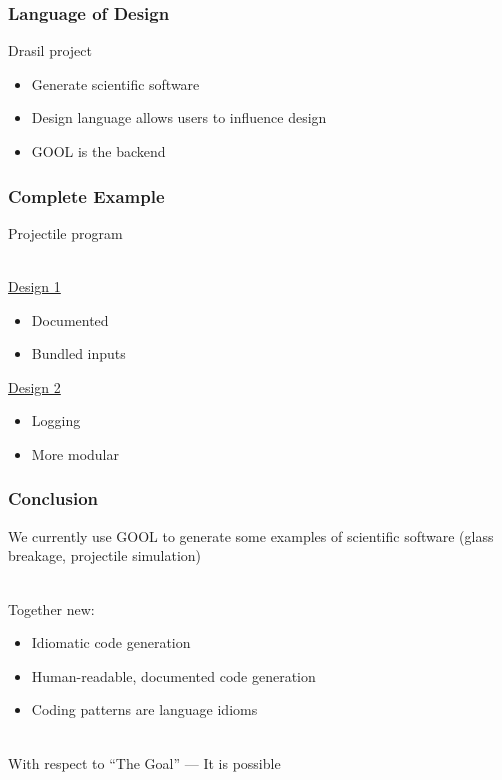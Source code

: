 \documentclass{beamer}
\begin{document}

\begin{frame}

\frametitle{Language of Design}

Drasil project
\begin{itemize}
\item Generate scientific software
\item Design language allows users to influence design
\item GOOL is the backend
\end{itemize}

\end{frame}


\begin{frame}

\frametitle{Complete Example}

Projectile program\\~\

\href{https://github.com/JacquesCarette/Drasil/tree/projectileDemos/Presentations/PEPM2020/projectile1}{Design
 1}
\begin{itemize}
	\item Documented
	\item Bundled inputs
\end{itemize}

\href{https://github.com/JacquesCarette/Drasil/tree/projectileDemos/Presentations/PEPM2020/projectile2}{Design
 2}
\begin{itemize}
	\item Logging
	\item More modular
\end{itemize}

\end{frame}


\begin{frame}

\frametitle{Conclusion}

We currently use GOOL to generate some examples of scientific software (glass 
breakage, projectile simulation)\\~\

Together new:
\begin{itemize}
  \item Idiomatic code generation
  \item Human-readable, documented code generation
  \item Coding patterns are language idioms\\~\
\end{itemize}

With respect to ``The Goal'' --- It is possible\\~\

\end{frame}
\end{document}
